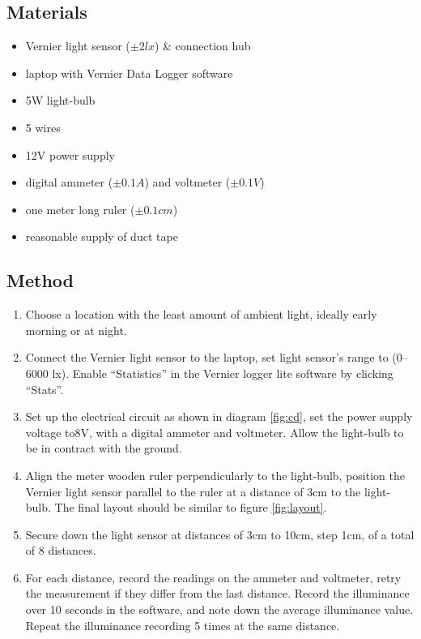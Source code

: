 \documentclass[a4paper,12pt]{article}
\begin{document}
\subsection{Materials}
\begin{itemize}
 \item Vernier light sensor ($\pm 2\si{lx}$) \& connection hub
 \item laptop with Vernier Data Logger software
 \item 5W light-bulb
 \item 5 wires
 \item 12V power supply
 \item digital ammeter ($\pm 0.1\si{A}$) and voltmeter ($\pm 0.1\si{V}$)
 \item one meter long ruler ($\pm 0.1\si{cm}$)
 \item reasonable supply of duct tape
 \end{itemize}

\subsection{Method}

\begin{enumerate}
 \item Choose a location with the least amount of ambient light, ideally early morning or at night.

 \item Connect the Vernier light sensor to the laptop, set light sensor's range to (0–6000 \si{lx}). Enable ``Statistics'' in the Vernier logger lite software by clicking ``Stats''.

 \item Set up the electrical circuit as shown in diagram \ref{fig:cd}, set the power supply voltage to8V, with a digital ammeter and voltmeter. Allow the light-bulb to be in contract with the ground.

 \item Align the meter wooden ruler perpendicularly to the light-bulb, position the Vernier light sensor parallel to the ruler at a distance of 3cm to the light-bulb. The final layout should be similar to figure \ref{fig:layout}.

 \item Secure down the light sensor at distances of 3cm to 10cm, step 1cm, of a total of 8 distances.

 \item For each distance, record the readings on the ammeter and voltmeter, retry the measurement if they differ from the last distance. Record the illuminance over 10 seconds in the software, and note down the average illuminance value. Repeat the illuminance recording 5 times at the same distance.
\end{enumerate}
\end{document}

